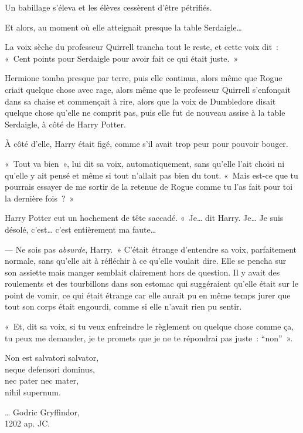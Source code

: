 Un babillage s'éleva et les élèves cessèrent d'être pétrifiés.

Et alors, au moment où elle atteignait presque la table Serdaigle…

La voix sèche du professeur Quirrell trancha tout le reste, et cette voix dit~: «~Cent points pour Serdaigle pour avoir fait ce qui était juste.~»

Hermione tomba presque par terre, puis elle continua, alors même que Rogue criait quelque chose avec rage, alors même que le professeur Quirrell s'enfonçait dans sa chaise et commençait à rire, alors que la voix de Dumbledore disait quelque chose qu'elle ne comprit pas, puis elle fut de nouveau assise à la table Serdaigle, à côté de Harry Potter.

À côté d'elle, Harry était figé, comme s'il avait trop peur pour pouvoir bouger.

«~Tout va bien~», lui dit sa voix, automatiquement, sans qu'elle l'ait choisi ni qu'elle y ait pensé et même si tout n'allait pas bien du tout. «~Mais est-ce que tu pourrais essayer de me sortir de la retenue de Rogue comme tu l'as fait pour toi la dernière fois~?~»

Harry Potter eut un hochement de tête saccadé. «~Je… dit Harry. Je… Je suis désolé, c'est… c'est entièrement ma faute…

--- Ne sois pas \emph{absurde}, Harry.~» C'était étrange d'entendre sa voix, parfaitement normale, sans qu'elle ait à réfléchir à ce qu'elle voulait dire. Elle se pencha sur son assiette mais manger semblait clairement hors de question. Il y avait des roulements et des tourbillons dans son estomac qui suggéraient qu'elle était sur le point de vomir, ce qui était étrange car elle aurait pu en même temps jurer que tout son corps était engourdi, comme si elle n'avait rien pu sentir.

«~Et, dit sa voix, si tu veux enfreindre le règlement ou quelque chose comme ça, tu peux me demander, je te promets que je ne te répondrai pas juste~: “non”~».
\later

\begin{center}
Non est salvatori salvator,\\
neque defensori dominus,\\
nec pater nec mater,\\
nihil supernum.

… Godric Gryffindor,\\
1202 ap. JC.
\end{center}

